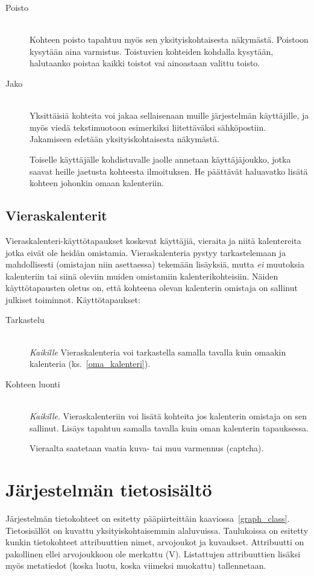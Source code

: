 \documentclass[a4paper,12pt]{report}
\begin{document}
\begin{description}
   \item[Poisto]\hfill\\
      Kohteen poisto tapahtuu myös sen yksityiskohtaisesta näkymästä.  Poistoon
      kysytään aina varmistus.  Toistuvien kohteiden kohdalla kysytään,
      halutaanko poistaa kaikki toistot vai ainoastaan valittu toisto.

   \item[Jako]\hfill\\
      Yksittäisiä kohteita voi jakaa sellaisenaan muille järjestelmän
      käyttäjille, ja myös viedä tekstimuotoon esimerkiksi liitettäväksi
      sähköpostiin.  Jakamiseen edetään yksityiskohtaisesta näkymästä. 

      Toiselle käyttäjälle kohdistuvalle jaolle annetaan käyttäjäjoukko, jotka
      saavat heille jaetusta kohteesta ilmoituksen.  He päättävät haluavatko
      lisätä kohteen johonkin omaan kalenteriin.
\end{description}

\subsection{Vieraskalenterit}
Vieraskalenteri-käyttötapaukset koskevat käyttäjiä, vieraita ja niitä
kalentereita jotka eivät ole heidän omistamia.  Vieraskalenteria pystyy
tarkastelemaan ja mahdollisesti (omistajan niin asettaessa) tekemään lisäyksiä,
mutta \emph{ei} muutoksia kalenteriin tai siinä oleviin muiden omistamiin
kalenterikohteisiin.  Näiden käyttötapausten oletus on, että kohteena olevan
kalenterin omistaja on sallinut julkiset toiminnot.  Käyttötapaukset:
\begin{description}
   \item[Tarkastelu]\hfill\\
      \textit{Kaikille} Vieraskalenteria voi tarkastella samalla tavalla kuin
      omaakin kalenteria (ks.~\ref{oma_kalenteri}).
   \item[Kohteen luonti]\hfill\\
      \textit{Kaikille}. Vieraskalenteriin voi lisätä kohteita jos kalenterin
      omistaja on sen sallinut.  Lisäys tapahtuu samalla tavalla kuin oman
      kalenterin tapauksessa. 

      Vieraalta saatetaan vaatia kuva- tai muu varmennus (captcha).
\end{description}

\section{Järjestelmän tietosisältö}
Järjestelmän tietokohteet on esitetty pääpiirteittäin
kaaviossa~\ref{graph_class}. Tietosisällöt on kuvattu yksityiskohtaisemmin
alaluvuissa. Taulukoissa on esitetty kunkin tietokohteet attribuuttien nimet,
arvojoukot ja kuvaukset. Attribuutti on pakollinen ellei arvojoukkoon ole
merkattu (V). Listattujen attribuuttien lisäksi myös metatiedot (koska luotu,
koska viimeksi muokattu) tallennetaan.
\end{document}
